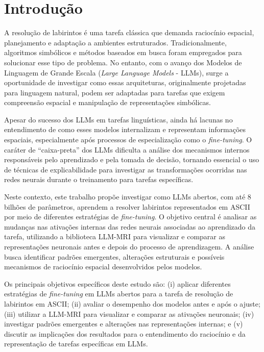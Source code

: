 \section{Introdução}\label{sec:introducao}

A resolução de labirintos é uma tarefa clássica que demanda raciocínio espacial, planejamento e adaptação a ambientes estruturados. Tradicionalmente, algoritmos simbólicos e métodos baseados em busca foram empregados para solucionar esse tipo de problema. No entanto, com o avanço dos Modelos de Linguagem de Grande Escala (\textit{Large Language Models} - LLMs), surge a oportunidade de investigar como essas arquiteturas, originalmente projetadas para linguagem natural, podem ser adaptadas para tarefas que exigem compreensão espacial e manipulação de representações simbólicas.

Apesar do sucesso dos LLMs em tarefas linguísticas, ainda há lacunas no entendimento de como esses modelos internalizam e representam informações espaciais, especialmente após processos de especialização como o \textit{fine-tuning}. O caráter de ``caixa-preta'' dos LLMs dificulta a análise dos mecanismos internos responsáveis pelo aprendizado e pela tomada de decisão, tornando essencial o uso de técnicas de explicabilidade para investigar as transformações ocorridas nas redes neurais durante o treinamento para tarefas específicas.

Neste contexto, este trabalho propõe investigar como LLMs abertos, com até 8 bilhões de parâmetros, aprendem a resolver labirintos representados em ASCII por meio de diferentes estratégias de \textit{fine-tuning}. O objetivo central é analisar as mudanças nas ativações internas das redes neurais associadas ao aprendizado da tarefa, utilizando a biblioteca LLM-MRI \cite{costa2024llmmri} para visualizar e comparar as representações neuronais antes e depois do processo de aprendizagem. A análise busca identificar padrões emergentes, alterações estruturais e possíveis mecanismos de raciocínio espacial desenvolvidos pelos modelos.

Os principais objetivos específicos deste estudo são: (i) aplicar diferentes estratégias de \textit{fine-tuning} em LLMs abertos para a tarefa de resolução de labirintos em ASCII; (ii) avaliar o desempenho dos modelos antes e após o ajuste; (iii) utilizar a LLM-MRI para visualizar e comparar as ativações neuronais; (iv) investigar padrões emergentes e alterações nas representações internas; e (v) discutir as implicações dos resultados para o entendimento do raciocínio e da representação de tarefas específicas em LLMs.

